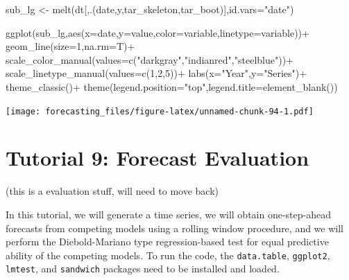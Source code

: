 \documentclass[
  12pt,
  oneside]{book}
\newenvironment{Shaded}{\begin{snugshade}}{\end{snugshade}}
\newcommand{\AttributeTok}[1]{\textcolor[rgb]{0.77,0.63,0.00}{#1}}
\newcommand{\DecValTok}[1]{\textcolor[rgb]{0.00,0.00,0.81}{#1}}
\newcommand{\FunctionTok}[1]{\textcolor[rgb]{0.00,0.00,0.00}{#1}}
\newcommand{\NormalTok}[1]{#1}
\newcommand{\OtherTok}[1]{\textcolor[rgb]{0.56,0.35,0.01}{#1}}
\newcommand{\SpecialCharTok}[1]{\textcolor[rgb]{0.00,0.00,0.00}{#1}}
\newcommand{\StringTok}[1]{\textcolor[rgb]{0.31,0.60,0.02}{#1}}
\begin{document}
\begin{Shaded}
\begin{Highlighting}[]
\NormalTok{sub\_lg }\OtherTok{\textless{}{-}} \FunctionTok{melt}\NormalTok{(dt[,.(date,y,tar\_skeleton,tar\_boot)],}\AttributeTok{id.vars=}\StringTok{"date"}\NormalTok{)}

\FunctionTok{ggplot}\NormalTok{(sub\_lg,}\FunctionTok{aes}\NormalTok{(}\AttributeTok{x=}\NormalTok{date,}\AttributeTok{y=}\NormalTok{value,}\AttributeTok{color=}\NormalTok{variable,}\AttributeTok{linetype=}\NormalTok{variable))}\SpecialCharTok{+}
  \FunctionTok{geom\_line}\NormalTok{(}\AttributeTok{size=}\DecValTok{1}\NormalTok{,}\AttributeTok{na.rm=}\NormalTok{T)}\SpecialCharTok{+}
  \FunctionTok{scale\_color\_manual}\NormalTok{(}\AttributeTok{values=}\FunctionTok{c}\NormalTok{(}\StringTok{"darkgray"}\NormalTok{,}\StringTok{"indianred"}\NormalTok{,}\StringTok{"steelblue"}\NormalTok{))}\SpecialCharTok{+}
  \FunctionTok{scale\_linetype\_manual}\NormalTok{(}\AttributeTok{values=}\FunctionTok{c}\NormalTok{(}\DecValTok{1}\NormalTok{,}\DecValTok{2}\NormalTok{,}\DecValTok{5}\NormalTok{))}\SpecialCharTok{+}
  \FunctionTok{labs}\NormalTok{(}\AttributeTok{x=}\StringTok{"Year"}\NormalTok{,}\AttributeTok{y=}\StringTok{"Series"}\NormalTok{)}\SpecialCharTok{+}
  \FunctionTok{theme\_classic}\NormalTok{()}\SpecialCharTok{+}
  \FunctionTok{theme}\NormalTok{(}\AttributeTok{legend.position=}\StringTok{"top"}\NormalTok{,}\AttributeTok{legend.title=}\FunctionTok{element\_blank}\NormalTok{())}
\end{Highlighting}
\end{Shaded}

\texttt{[image: forecasting\_files/figure-latex/unnamed-chunk-94-1.pdf]}

\hypertarget{tutorial-9-forecast-evaluation}{%
\chapter*{Tutorial 9: Forecast Evaluation}\label{tutorial-9-forecast-evaluation}}

(this is a evaluation stuff, will need to move back)

In this tutorial, we will generate a time series, we will obtain one-step-ahead forecasts from competing models using a rolling window procedure, and we will perform the Diebold-Mariano type regression-based test for equal predictive ability of the competing models. To run the code, the \texttt{data.table}, \texttt{ggplot2}, \texttt{lmtest}, and \texttt{sandwich} packages need to be installed and loaded.
\end{document}
